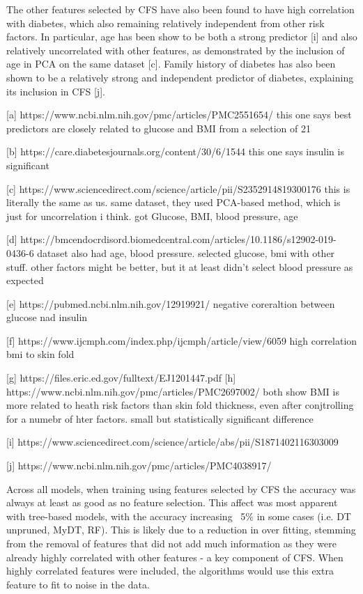 The other features selected by CFS have also been found to have high correlation with diabetes, which also remaining relatively independent from other risk factors. In particular, age has been show to be both a strong predictor [i] and also relatively uncorrelated with other features, as demonstrated by the inclusion of age in PCA on the same dataset [c]. Family history of diabetes has also been shown to be a relatively strong and independent predictor of diabetes, explaining its inclusion in CFS [j].


[a] https://www.ncbi.nlm.nih.gov/pmc/articles/PMC2551654/
this one says best predictors are closely related to glucose and BMI from a selection of 21

[b] https://care.diabetesjournals.org/content/30/6/1544
this one says insulin is significant

[c] https://www.sciencedirect.com/science/article/pii/S2352914819300176
this is literally the same as us. same dataset, they used PCA-based method, which is just for uncorrelation i think. got Glucose, BMI, blood pressure, age

[d] https://bmcendocrdisord.biomedcentral.com/articles/10.1186/s12902-019-0436-6
dataset also had age, blood pressure. selected glucose, bmi with other stuff. other factors might be better, but it at least didn't select blood pressure as expected

[e] https://pubmed.ncbi.nlm.nih.gov/12919921/
negative coreraltion between glucose nad insulin

[f] https://www.ijcmph.com/index.php/ijcmph/article/view/6059
high correlation bmi to skin fold

[g] https://files.eric.ed.gov/fulltext/EJ1201447.pdf
[h] https://www.ncbi.nlm.nih.gov/pmc/articles/PMC2697002/
both show BMI is more related to heath risk factors than skin fold thickness, even after conjtrolling for a numebr of hter factors. small but statistically significant difference

[i] https://www.sciencedirect.com/science/article/abs/pii/S1871402116303009

[j] https://www.ncbi.nlm.nih.gov/pmc/articles/PMC4038917/





Across all models, when training using features selected by CFS the accuracy was always at least as good as no feature selection. This affect was most apparent with tree-based models, with the accuracy increasing ~5\% in some cases (i.e. DT unpruned, MyDT, RF). This is likely due to a reduction in over fitting, stemming from the removal of features that did not add much information as they were already highly correlated with other features - a key component of CFS. When highly correlated features were included, the algorithms would use this extra feature to fit to noise in the data.

